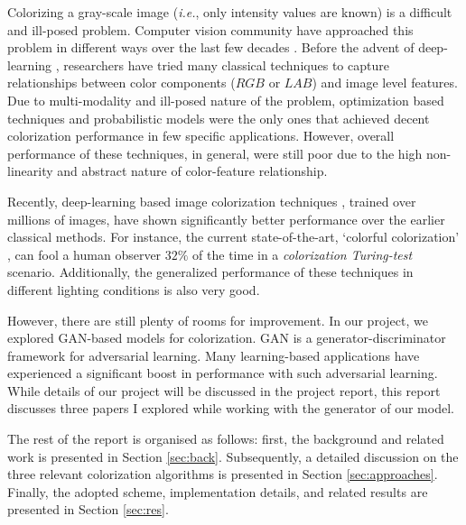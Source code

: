 \documentclass[10pt]{article}
\begin{document}
Colorizing a gray-scale image (\textit{i.e.}, only intensity values are known) is a difficult and ill-posed problem. Computer vision community have approached this problem in different ways over the last few decades \cite{zhang2016colorful, cheng2015deep, bugeau2014variational, charpiat2008automatic, luan2007natural, konushin2006interactive}. Before the advent of deep-learning \cite{lecun2015deep}, researchers have tried many classical techniques \cite{charpiat2008automatic, luan2007natural, konushin2006interactive, levin2004colorization, lagodzinski2008digital} to capture relationships between color components ($RGB$ or $LAB$) and image level features. 
Due to multi-modality and ill-posed nature of the problem, optimization based techniques \cite{levin2004colorization, charpiat2008automatic} and probabilistic models \cite{lagodzinski2008digital} were the only ones that achieved decent colorization performance in few specific applications. 
However, overall performance of these techniques, in general, were still poor due to the high non-linearity and abstract nature of color-feature relationship.  

Recently, deep-learning based image colorization techniques \cite{zhang2016colorful, cheng2015deep, varga2016fully, li2017watergan}, trained over millions of images, have shown significantly better performance over the earlier classical methods. For instance, the current state-of-the-art, `colorful colorization' \cite{zhang2016colorful}, can fool a human observer $32\%$ of the time in a \textit{colorization Turing-test} scenario. Additionally, the generalized performance of these techniques in different lighting conditions is also very good. 

However, there are still plenty of rooms for improvement. In our project, we explored GAN-based models for colorization. GAN \cite{goodfellow2014generative} is a generator-discriminator  framework for adversarial learning. Many learning-based applications have experienced a significant boost in performance with such adversarial learning. While details of our project will be discussed in the project report, this report discusses three papers I explored while working with the generator of our model.  

The rest of the report is organised as follows: first, the background and related work is presented in Section \ref{sec:back}. Subsequently, a detailed discussion on the three relevant colorization algorithms is presented in Section \ref{sec:approaches}. Finally, the adopted scheme, implementation details, and related results are presented in Section \ref{sec:res}. 
\end{document}
